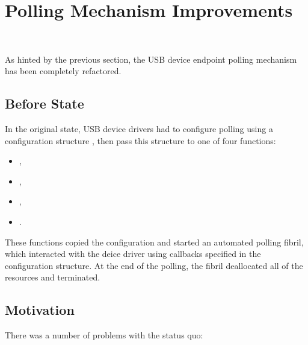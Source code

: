 \section{Polling Mechanism Improvements}~\label{polling-refactoring}

As hinted by the previous section, the USB device endpoint polling mechanism has
been completely refactored.


\subsection{Before State}

In the original state, USB device drivers had to configure polling using a
configuration structure , then pass this
structure to one of four functions:

\begin{itemize}
	\item {},
	\item {},
	\item {},
	\item {}.
\end{itemize}

These functions copied the configuration and started an automated polling
fibril, which interacted with the deice driver using callbacks specified in the
configuration structure. At the end of the polling, the fibril deallocated all
of the resources and terminated.


\subsection{Motivation}

There was a number of problems with the status quo:

